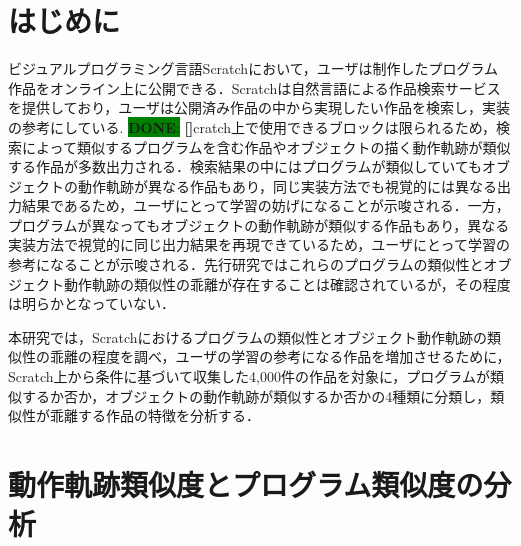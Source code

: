 \documentclass[T,J]{fose} %
\newcommand{\done}[2]{\colorbox{green}{{\bf DONE}:} {\textbf{[#1]}}}
\begin{document}
\section{はじめに}

ビジュアルプログラミング言語Scratchにおいて，ユーザは制作したプログラム作品をオンライン上に公開できる．Scratchは自然言語による作品検索サービスを提供しており，ユーザは公開済み作品の中から実現したい作品を検索し，実装の参考にしている\cite{Resnick_2009}.
\done{}Scratch上で使用できるブロックは限られるため，検索によって類似するプログラムを含む作品やオブジェクトの描く動作軌跡が類似する作品が多数出力される．検索結果の中にはプログラムが類似していてもオブジェクトの動作軌跡が異なる作品もあり，同じ実装方法でも視覚的には異なる出力結果であるため，ユーザにとって学習の妨げになることが示唆される．一方，プログラムが異なってもオブジェクトの動作軌跡が類似する作品もあり，異なる実装方法で視覚的に同じ出力結果を再現できているため，ユーザにとって学習の参考になることが示唆される．先行研究\cite{Fukuchi2021}\cite{Mikura2022}ではこれらのプログラムの類似性とオブジェクト動作軌跡の類似性の乖離が存在することは確認されているが，その程度は明らかとなっていない．

本研究では，Scratchにおけるプログラムの類似性とオブジェクト動作軌跡の類似性の乖離の程度を調べ，ユーザの学習の参考になる作品を増加させるために，Scratch上から条件に基づいて収集した4,000件の作品を対象に，プログラムが類似するか否か，オブジェクトの動作軌跡が類似するか否かの4種類に分類し，類似性が乖離する作品の特徴を分析する．

\section{動作軌跡類似度とプログラム類似度の分析}\label{sec:Analysis}

\end{document}
